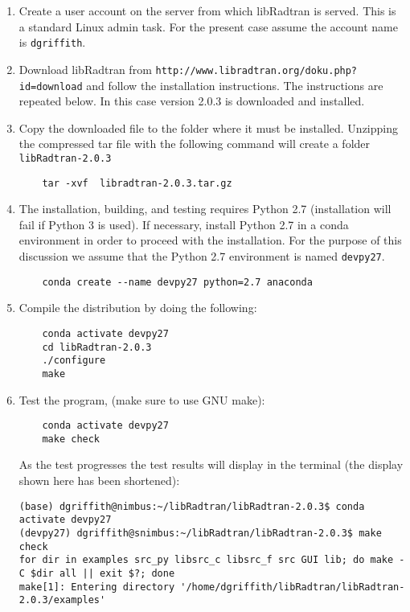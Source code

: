 \begin{enumerate}
\item Create a user account on the server from which libRadtran is served. This is a standard Linux admin task.  For the present case assume the account name is \lstinline{dgriffith}.

\item Download libRadtran from \lstinline{http://www.libradtran.org/doku.php?id=download} and follow the installation instructions. The instructions are repeated below.      In this case \libradtran{} version 2.0.3 is downloaded and installed.

\item Copy the downloaded file to the folder where it must be installed. Unzipping the compressed tar file with the following command will create a folder \lstinline{libRadtran-2.0.3}

\begin{lstlisting}
    tar -xvf  libradtran-2.0.3.tar.gz
\end{lstlisting}
\item The \libradtran{} installation, building, and testing requires Python 2.7 (installation will fail if Python 3 is used).  If necessary, install Python 2.7 in a conda environment in order to proceed with the \libradtran{} installation.  For the purpose of this discussion we assume that the Python 2.7 environment is named \lstinline{devpy27}.

\begin{lstlisting}
    conda create --name devpy27 python=2.7 anaconda
\end{lstlisting}

\item Compile the distribution by doing the following:

\begin{lstlisting}
    conda activate devpy27
    cd libRadtran-2.0.3
    ./configure
    make
\end{lstlisting}
\item Test the program, (make sure to use GNU make):

\begin{lstlisting}
    conda activate devpy27
    make check 
\end{lstlisting}
 As the test progresses the test results will display in the terminal (the display shown here has been shortened):


\begin{lstlisting}[style=tinysize]
(base) dgriffith@nimbus:~/libRadtran/libRadtran-2.0.3$ conda activate devpy27
(devpy27) dgriffith@snimbus:~/libRadtran/libRadtran-2.0.3$ make check
for dir in examples src_py libsrc_c libsrc_f src GUI lib; do make -C $dir all || exit $?; done
make[1]: Entering directory '/home/dgriffith/libRadtran/libRadtran-2.0.3/examples'


\end{lstlisting}
\end{enumerate}
